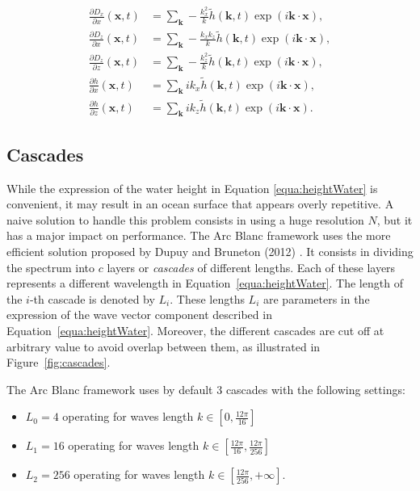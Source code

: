 \documentclass[final]{jcgt}
\def\Framework{The Arc Blanc framework\xspace}
\begin{document}
\begin{align*}
	\frac{\partial D_x}{\partial x}(\mathbf x,t) & = \sum_{\mathbf{k}} -\frac{k_x^2}{k} \tilde{h}(\mathbf{k}, t)\exp\left( i \mathbf{k}\cdot \mathbf x\right),  \\
	\frac{\partial D_z}{\partial x}(\mathbf x,t) & = \sum_{\mathbf{k}} -\frac{k_xk_z}{k} \tilde{h}(\mathbf{k}, t)\exp\left( i \mathbf{k}\cdot \mathbf x\right), \\
	\frac{\partial D_z}{\partial z}(\mathbf x,t) & = \sum_{\mathbf{k}} -\frac{k_z^2}{k} \tilde{h}(\mathbf{k}, t)\exp\left( i \mathbf{k}\cdot \mathbf x\right),  \\
	\frac{\partial h}{\partial x}(\mathbf x,t)   & = \sum_{\mathbf{k}} ik_x \tilde{h}(\mathbf{k}, t)\exp\left( i \mathbf{k}\cdot \mathbf x\right),              \\
	\frac{\partial h}{\partial z}(\mathbf x,t)   & = \sum_{\mathbf{k}} ik_z \tilde{h}(\mathbf{k}, t)\exp\left( i \mathbf{k}\cdot \mathbf x\right).
\end{align*}

\subsection{Cascades}
\label{subsec:cascades}
While the expression of the water height in Equation \ref{equa:heightWater} is convenient, it may result in an ocean surface that appears overly repetitive.
A naive solution to handle this problem consists in using a huge resolution $N$, but it has a major impact on performance.
\Framework uses the more efficient solution proposed by Dupuy and Bruneton (2012) \cite{dupuyRealtimeAnimationRendering2012}.
It consists in dividing the spectrum into $c$ layers or \emph{cascades} of different lengths.
Each of these layers represents a different wavelength in Equation~\ref{equa:heightWater}.
The length of the $i$-th cascade is denoted by $L_i$.
These lengths $L_i$ are parameters in the expression of the wave vector component described in Equation~\ref{equa:heightWater}.
Moreover, the different cascades are cut off at arbitrary value to avoid overlap between them, as illustrated in Figure~\ref{fig:cascades}.

\Framework uses by default $3$ cascades with the following settings:
\begin{itemize}
	\item $L_0 = 4$ operating for waves length $k\in [0,\frac{12\pi}{16}]$
	\item $L_1 = 16$ operating for waves length $k\in [\frac{12\pi}{16},\frac{12\pi}{256}]$
	\item $L_2 = 256$ operating for waves length $k\in [\frac{12\pi}{256},+\infty]$.
\end{itemize}
\end{document}
